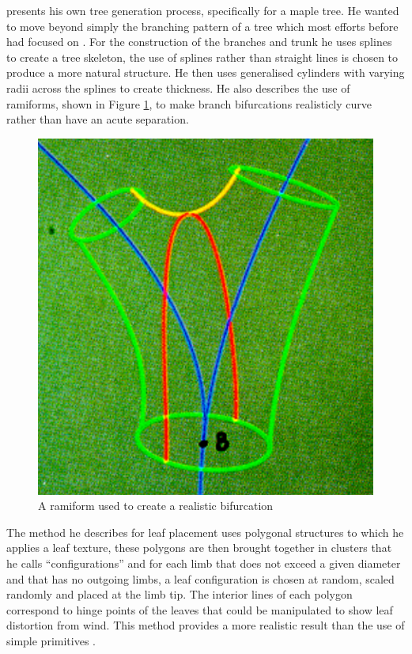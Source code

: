 \documentclass[final]{cmpreport}
\begin{document}
\cite{bloomenthal1985modeling} presents his own tree generation process, specifically 
for a maple tree. He wanted to move beyond simply the branching pattern of a tree which 
most efforts before had focused on \citep{brooks1974geometry,marshall1980procedure,kawaguchi1982morphological,aono1984botanical,smith1984plants}.
For the construction of the branches and trunk he uses splines to create a tree skeleton, 
the use of splines rather than straight lines is chosen to produce a more natural structure. 
He then uses generalised cylinders with varying radii across the splines to create thickness. 
He also describes the use of ramiforms, shown in Figure \ref{fig:bloomenthal-ramiform}, to 
make branch bifurcations realisticly curve rather than have an acute separation.

\begin{figure}[ht]
    \includegraphics[scale=0.35]{bloomenthal-ramiform.PNG}
    \centering
    \captionsetup{justification=centering}
    \caption{A ramiform used to create a realistic bifurcation}
    \label{fig:bloomenthal-ramiform}
\end{figure}

The method he describes for leaf placement uses polygonal structures to which he applies 
a leaf texture, these polygons are then brought together in clusters that he calls 
``configurations'' and for each limb that does not exceed a given diameter and that has 
no outgoing limbs, a leaf configuration is chosen at random, scaled randomly and placed 
at the limb tip. The interior lines of each polygon correspond to hinge points of the 
leaves that could be manipulated to show leaf distortion from wind. This method provides 
a more realistic result than the use of simple primitives \citep{kawaguchi1982morphological,lintermann1999interactive,candussi2005rendering}.
\end{document}
